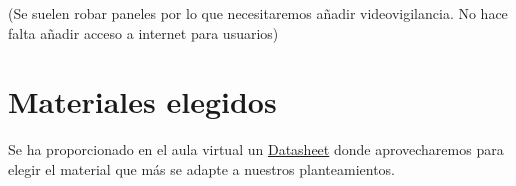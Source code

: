 \documentclass{article}
\begin{document}
(Se suelen robar paneles por lo que necesitaremos añadir videovigilancia. No hace falta añadir acceso a internet para usuarios)

\section{Materiales elegidos}

Se ha proporcionado en el aula virtual un \href{http://www.microcom.com.ar/fotos/ficha7097LBE-M5-23.compressed.pdf}{Datasheet} donde aprovecharemos para elegir el material que más se adapte a nuestros planteamientos. 
\end{document}
